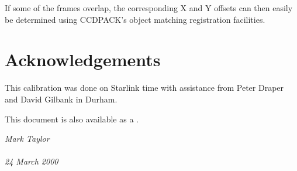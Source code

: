 \documentclass[11pt]{article}
\begin{document}
If some of the frames overlap, the corresponding X and Y 
offsets can then easily be determined 
using CCDPACK's object matching registration facilities.


\section*{Acknowledgements}

This calibration was done on Starlink time with assistance from 
Peter Draper and David Gilbank in Durham.

\begin{htmlonly}
\htmlrule
This document is also available as a
.
\end{htmlonly}


\latexhtml{\vspace{\fill}}{\htmlrule}

\begin{flushright}
\it
Mark Taylor \\
 \\
24 March 2000
\end{flushright}
\end{document}
